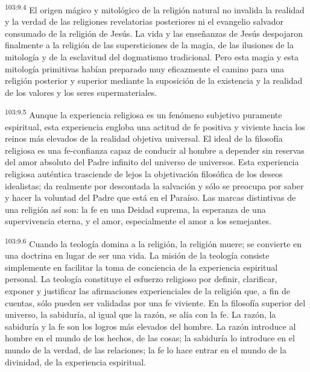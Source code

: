 \documentclass[twoside, 11pt]{book}
\begin{document}
\par
\textsuperscript{103:9.4} El origen mágico y mitológico de la religión natural no invalida la realidad y la verdad de las religiones revelatorias posteriores ni el evangelio salvador consumado de la religión de Jesús. La vida y las enseñanzas de Jesús despojaron finalmente a la religión de las supersticiones de la magia, de las ilusiones de la mitología y de la esclavitud del dogmatismo tradicional. Pero esta magia y esta mitología primitivas habían preparado muy eficazmente el camino para una religión posterior y superior mediante la suposición de la existencia y la realidad de los valores y los seres supermateriales.

\par
\textsuperscript{103:9.5} Aunque la experiencia religiosa es un fenómeno subjetivo puramente espiritual, esta experiencia engloba una actitud de fe positiva y viviente hacia los reinos más elevados de la realidad objetiva universal. El ideal de la filosofía religiosa es una fe-confianza capaz de conducir al hombre a depender sin reservas del amor absoluto del Padre infinito del universo de universos. Esta experiencia religiosa auténtica trasciende de lejos la objetivación filosófica de los deseos idealistas; da realmente por descontada la salvación y sólo se preocupa por saber y hacer la voluntad del Padre que está en el Paraíso. Las marcas distintivas de una religión así son: la fe en una Deidad suprema, la esperanza de una supervivencia eterna, y el amor, especialmente el amor a los semejantes.

\par
\textsuperscript{103:9.6} Cuando la teología domina a la religión, la religión muere; se convierte en una doctrina en lugar de ser una vida. La misión de la teología consiste simplemente en facilitar la toma de conciencia de la experiencia espiritual personal. La teología constituye el esfuerzo religioso por definir, clarificar, exponer y justificar las afirmaciones experienciales de la religión que, a fin de cuentas, sólo pueden ser validadas por una fe viviente. En la filosofía superior del universo, la sabiduría, al igual que la razón, se alía con la fe. La razón, la sabiduría y la fe son los logros más elevados del hombre. La razón introduce al hombre en el mundo de los hechos, de las cosas; la sabiduría lo introduce en el mundo de la verdad, de las relaciones; la fe lo hace entrar en el mundo de la divinidad, de la experiencia espiritual.
\end{document}
